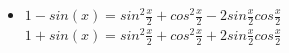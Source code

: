 \documentclass[12pt]{article}
\begin{document}
\begin{multicols}{2}
\begin{itemize}
  \item $1-sin(x)=sin^2{\frac{x}{2}}+cos^2{\frac{x}{2}}-2 sin{\frac{x}{2}}cos{\frac{x}{2}}$
   $1+sin(x)=sin^2{\frac{x}{2}}+cos^2{\frac{x}{2}}+2 sin{\frac{x}{2}}cos{\frac{x}{2}}$

\end{itemize}









\end{multicols}
\end{document}
